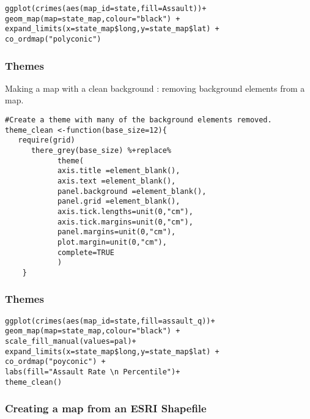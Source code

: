 \documentclass{beamer}
\begin{document}
\begin{frame}
\begin{frame}[fragile]
\begin{framed}
\begin{verbatim}
ggplot(crimes(aes(map_id=state,fill=Assault))+
geom_map(map=state_map,colour="black") + 
expand_limits(x=state_map$long,y=state_map$lat) +
co_ordmap("polyconic")
\end{verbatim}
\end{framed}
\end{frame}
\begin{frame}[fragile]
\frametitle{Themes}
Making a map with a clean background : removing background elements from a map.


\begin{framed}
\begin{verbatim}
#Create a theme with many of the background elements removed.
theme_clean <-function(base_size=12){
   require(grid)
      there_grey(base_size) %+replace%
          	theme(
			axis.title =element_blank(),
			axis.text =element_blank(),
			panel.background =element_blank(),
			panel.grid =element_blank(),
			axis.tick.lengths=unit(0,"cm"),
			axis.tick.margins=unit(0,"cm"),
			panel.margins=unit(0,"cm"),
			plot.margin=unit(0,"cm"),
			complete=TRUE
			)
	}
\end{verbatim}
\end{framed}
\end{frame}
\begin{frame}[fragile]
\frametitle{Themes}
\begin{framed}
\begin{verbatim}
ggplot(crimes(aes(map_id=state,fill=assault_q))+
geom_map(map=state_map,colour="black") + 
scale_fill_manual(values=pal)+
expand_limits(x=state_map$long,y=state_map$lat) +
co_ordmap("poyconic") + 
labs(fill="Assault Rate \n Percentile")+
theme_clean()

\end{verbatim}
\end{framed}
\end{frame}

 


\begin{frame}
\frametitle{Creating a map from an ESRI Shapefile}


\end{frame}
\end{frame}
\end{document}
